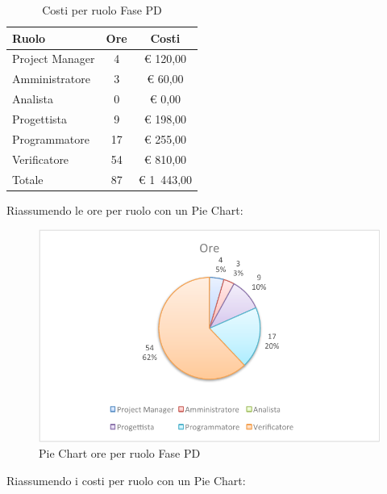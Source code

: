 				\begin{table}[H]
					\begin{center}
						\begin{tabular}{| l | c | c |}
							\hline
							Ruolo 				& Ore 		& Costi  \\ \hline
							
							Project Manager		& 4 		& \euro{} 120,00 	\\
							Amministratore 		& 3 		& \euro{} 60,00 	\\
							Analista	 		& 0			& \euro{} 0,00	\\
							Progettista 		& 9 		& \euro{} 198,00  	\\
							Programmatore		& 17 		& \euro{} 255,00 	\\
							Verificatore		& 54 		& \euro{} 810,00 	\\ \hline \hline
							
							Totale	 			& 87 		& \euro{} 1~443,00 	\\ \hline
						\end{tabular}
					\end{center}
					\caption{Costi per ruolo Fase PD}
				\end{table}
				Riassumendo le ore per ruolo con un Pie Chart:
				\begin{figure}[H]\centering
					\includegraphics[width=\textwidth]{PianoDiProgetto/Pics/ChartTotOreFasePD.pdf}
					\caption{Pie Chart ore per ruolo Fase PD}
				\end{figure}
				Riassumendo i costi per ruolo con un Pie Chart:
